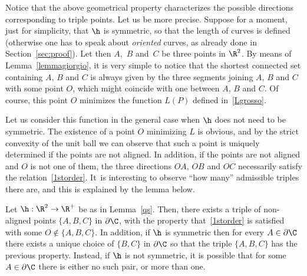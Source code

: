 Notice that the above geometrical property characterizes the possible directions corresponding to triple points. Let us be more precise. Suppose for a moment, just for simplicity, that $\h$ is symmetric, so that the length of curves is defined (otherwise one has to speak about \emph{oriented} curves, as already done in Section~\ref{sec:proof}). Let then $A$,~$B$ and~$C$ be three points in $\R^2$. By means of Lemma~\ref{lemmagiorgio}, it is very simple to notice that the shortest connected set containing $A,\,B$ and $C$ is always given by the three segments joining $A$, $B$ and $C$ with some point $O$, which might coincide with one between $A$, $B$ and $C$. Of course, this point $O$ minimizes the function $L(P)$ defined in~\eqref{Lgrosso}.

Let us consider this function in the general case when $\h$ does not need to be symmetric. The existence of a point $O$ minimizing $L$ is obvious, and by the strict convexity of the unit ball we can observe that such a point is uniquely determined if the points are not aligned. In addition, if the points are not aligned and $O$ is not one of them, the three directions $OA,\,OB$ and $OC$ necessarily satisfy the relation~\eqref{1storder}. It~is interesting to observe ``how many'' admissible triples there are, and this is explained by the lemma below.
\begin{lem}
Let $\h:\R^2\to\R^+$ be as in Lemma~\ref{qs}. Then, there exists a triple of non-aligned points $\{A,B,C\}$ in $\partial\C$, with the property that~\eqref{1storder} is satisfied with some $O\notin \{A,B,C\}$. In addition, if $\h$ is symmetric then for every $A\in\partial \C$ there exists a unique choice of $\{B,C\}$ in $\partial\C$ so that the triple $\{A,B,C\}$ has the previous property. Instead, if $\h$ is not symmetric, it is possible that for some $A\in\partial\C$ there is either no such pair, or more than one.
\end{lem}
